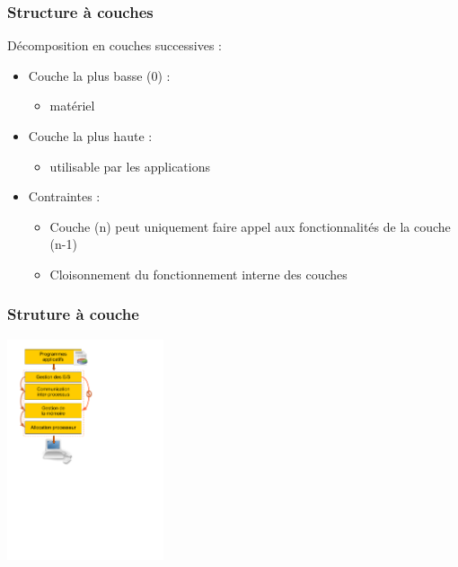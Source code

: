 \begin{frame}
\frametitle{Structure à couches}
Décomposition en couches successives :
\begin{itemize}
\item Couche la plus basse (0) :
\begin{itemize}
\item matériel
\end{itemize}

\item Couche la plus haute :
\begin{itemize}
\item utilisable par les applications
\end{itemize}

\item Contraintes :
\begin{itemize}
\item Couche (n) peut uniquement faire appel aux fonctionnalités de la couche (n-1)
\item Cloisonnement du fonctionnement interne des couches
\end{itemize}
\end{itemize}
\end{frame}


\begin{frame}
\frametitle{Struture à couche}
\begin{center}
\includegraphics[height=6.5cm]{../illustration/modele_couche.pdf}
\end{center}
\end{frame}


